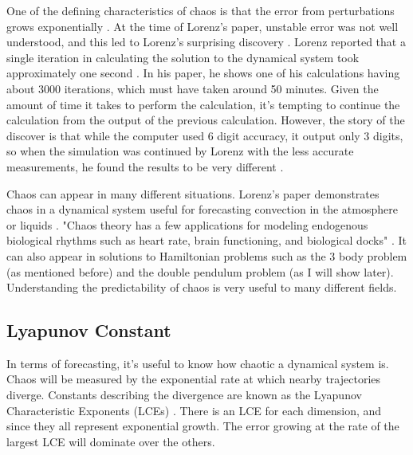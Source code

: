 \documentclass{article}
\begin{document}
One of the defining characteristics of chaos is that the error from
perturbations grows exponentially \cite{oestreicher2007history}. At the time
of Lorenz's paper, unstable error was not well understood, and this led to
Lorenz's surprising discovery \cite{oestreicher2007history}. Lorenz reported
that a single iteration in calculating the solution to the dynamical system
took approximately one second \cite{lorenz1963deterministic}. In his paper,
he shows one of his calculations having about 3000 iterations, which must
have taken around 50 minutes. Given the amount of time it takes to perform
the calculation, it's tempting to continue the calculation from the output of
the previous calculation. However, the story of the discover is that while
the computer used 6 digit accuracy, it output only 3 digits, so when the
simulation was continued by Lorenz with the less accurate measurements, he
found the results to be very different \cite{oestreicher2007history}.

Chaos can appear in many different situations. Lorenz's paper demonstrates
chaos in a dynamical system useful for forecasting convection in the
atmosphere or liquids \cite{lorenz1963deterministic}. "Chaos theory has a few
applications for modeling endogenous biological rhythms such as heart rate,
brain functioning, and biological docks" \cite{oestreicher2007history}. It
can also appear in solutions to Hamiltonian problems such as the 3 body
problem (as mentioned before) and the double pendulum problem (as I will show
later). Understanding the predictability of chaos is very useful to many
different fields.

\subsection{Lyapunov Constant}

In terms of forecasting, it's useful to know how chaotic a dynamical system
is. Chaos will be measured by the exponential rate at which nearby
trajectories diverge. Constants describing the divergence are known as the
Lyapunov Characteristic Exponents (LCEs) \cite{sandri1996numerical}. There is
an LCE for each dimension, and since they all represent exponential growth.
The error growing at the rate of the largest LCE will dominate over the
others.

\end{document}
